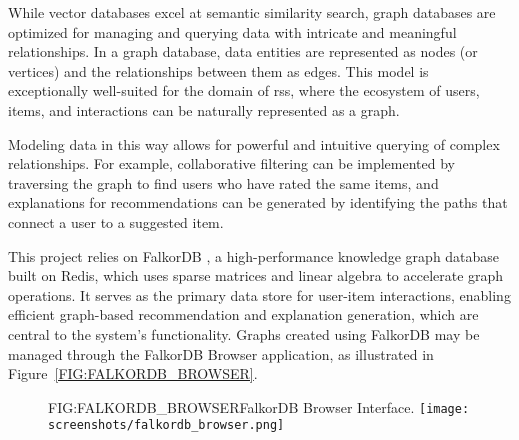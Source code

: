 While vector databases excel at semantic similarity search, graph databases are optimized for managing and querying data with intricate and meaningful relationships. In a graph database, data entities are represented as nodes (or vertices) and the relationships between them as edges. This model is exceptionally well-suited for the domain of \aclp{rs}, where the ecosystem of users, items, and interactions can be naturally represented as a graph.

Modeling data in this way allows for powerful and intuitive querying of complex relationships. For example, collaborative filtering can be implemented by traversing the graph to find users who have rated the same items, and explanations for recommendations can be generated by identifying the paths that connect a user to a suggested item.

This project relies on FalkorDB \cite{FALKORDB}, a high-performance knowledge graph database built on Redis, which uses sparse matrices and linear algebra to accelerate graph operations. It serves as the primary data store for user-item interactions, enabling efficient graph-based recommendation and explanation generation, which are central to the system's functionality. Graphs created using FalkorDB may be managed through the FalkorDB Browser application, as illustrated in Figure~\ref{FIG:FALKORDB_BROWSER}.

\begin{figure}[FalkorDB Browser Interface]{FIG:FALKORDB_BROWSER}{FalkorDB Browser Interface.}
    \texttt{[image: screenshots/falkordb\_browser.png]}
\end{figure}
